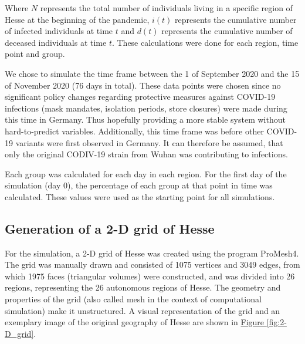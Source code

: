 \par
Where $N$ represents the total number of individuals living in a specific region of Hesse at the beginning of the pandemic, $i(t)$
represents the cumulative number of infected individuals at time $t$ and $d(t)$ represents the cumulative number of deceased
individuals at time $t$. These calculations were done for each region, time point and group.\newline

We chose to simulate the time frame between the 1 of September 2020 and the 15 of November 2020 (76 days in total). These
data points were chosen since no significant policy changes regarding protective measures against COVID-19 infections
(mask mandates, isolation periods, store closures)  were made during this time in Germany. Thus hopefully providing a more stable system
without hard-to-predict variables. Additionally, this time frame was before other COVID-19 variants were first observed in
Germany\cite{RKIvariants}. It can therefore be assumed, that only the original CODIV-19 strain from Wuhan was contributing to infections.\newline

Each group was calculated for each day in each region. For the first day of the simulation (day 0), the percentage of each group at that
point in time was calculated. These values were used as the starting point for all simulations.


\subsection{Generation of a 2-D grid of Hesse}
For the simulation, a 2-D grid of Hesse was created using the program ProMesh4. The grid was manually drawn and consisted
of 1075 vertices and 3049 edges, from which 1975 faces (triangular volumes) were constructed, and was divided into 26 regions,
representing the 26 autonomous regions of Hesse. The geometry and properties of the grid (also called mesh in the context of computational simulation)
make it unstructured. A visual representation of the grid and an exemplary
image of the original geography of Hesse are shown in \hyperref[fig:2-D_grid]{Figure \ref*{fig:2-D_grid}}.


